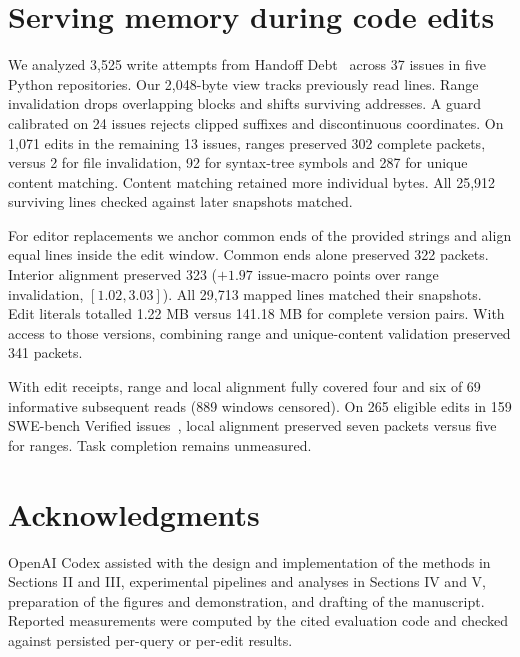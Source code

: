 \documentclass[conference]{IEEEtran}
\begin{document}
\section{Serving memory during code edits}
We analyzed 3,525 write attempts from Handoff Debt~\cite{handoff} across 37 issues in five Python repositories. Our 2,048-byte view tracks previously read lines. Range invalidation drops overlapping blocks and shifts surviving addresses. A guard calibrated on 24 issues rejects clipped suffixes and discontinuous coordinates. On 1,071 edits in the remaining 13 issues, ranges preserved 302 complete packets, versus 2 for file invalidation, 92 for syntax-tree symbols and 287 for unique content matching. Content matching retained more individual bytes. All 25,912 surviving lines checked against later snapshots matched.

For editor replacements we anchor common ends of the provided strings and align equal lines inside the edit window. Common ends alone preserved 322 packets. Interior alignment preserved 323 ($+1.97$ issue-macro points over range invalidation, $[1.02,3.03]$). All 29,713 mapped lines matched their snapshots. Edit literals totalled 1.22 MB versus 141.18 MB for complete version pairs. With access to those versions, combining range and unique-content validation preserved 341 packets.

With edit receipts, range and local alignment fully covered four and six of 69 informative subsequent reads (889 windows censored). On 265 eligible edits in 159 SWE-bench Verified issues~\cite{swe-run}, local alignment preserved seven packets versus five for ranges. Task completion remains unmeasured.



\section*{Acknowledgments}
OpenAI Codex assisted with the design and implementation of the methods in Sections II and III, experimental pipelines and analyses in Sections IV and V, preparation of the figures and demonstration, and drafting of the manuscript. Reported measurements were computed by the cited evaluation code and checked against persisted per-query or per-edit results.



\end{document}
